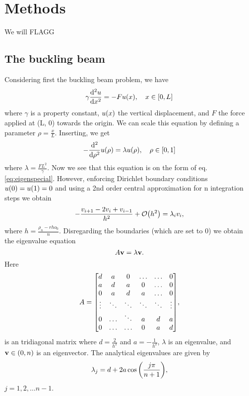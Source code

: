 \section{Methods}
\label{sec:methods}

We will FLAGG

\subsection{The buckling beam}
\label{sec:bucklingbeam}

Considering first the buckling beam problem, we have
  \begin{equation}
    \gamma \dv[2]{u}{x} = -F u\qty(x), \quad x \in [0, L]
  \end{equation}
where $\gamma$ is a property constant, $u\qty(x)$ the vertical displacement, and
$F$ the force applied at (L, 0) towards the origin. We can scale this equation by defining
a parameter $\rho = \frac{x}{L}$. Inserting, we get
  \begin{equation}
    -\dv[2]{}{\rho}u\qty(\rho) = \lambda u\qty(\rho), \quad \rho \in [0, 1]
  \end{equation}
where $\lambda = \frac{FL^2}{\gamma}$. Now we see that this equation is on the form
of eq. \ref{eq:eigenspecial}. However, enforcing Dirichlet boundary conditions
$u\qty(0) = u\qty(1) = 0$ and using a 2nd order central approximation for n integration steps we obtain
  \begin{equation}
  \label{eq:disc1}
    -\frac{v_{i+1} - 2v_i + v_{i-1}}{h^2} + \order{h^2} = \lambda_i v_i,
  \end{equation}
where $h = \frac{\rho_n - rho_0}{n}$. Disregarding the boundaries (which are set to 0) we obtain the eigenvalue equation
  \begin{equation}
  \label{eq:buckbeam}
    A\vb{v} = \lambda \vb{v}.
  \end{equation}
Here
  \begin{equation}
    A =
      \mqty[d & a & 0 & \hdots & \hdots & 0 \\
            a & d & a & 0 & \hdots & 0 \\
            0 & a & d & a & \hdots & 0 \\
            \vdots & \ddots & \ddots & \ddots & \ddots & \vdots \\
            0 & \hdots & \ddots & a & d & a \\
            0 & \hdots & \hdots & 0 & a & d],
  \end{equation}
 is an tridiagonal matrix where $d = \frac{2}{h^2}$ and $a = -\frac{1}{h^2}$,
 $\lambda$ is an eigenvalue, and $\vb{v} \in \qty(0, n)$ is an eigenvector.
 The analytical eigenvalues are given by
  \begin{equation}
    \lambda_j = d + 2a\cos\qty(\frac{j\pi}{n + 1}),
  \end{equation}
$j = 1, 2, \dots n-1$.



